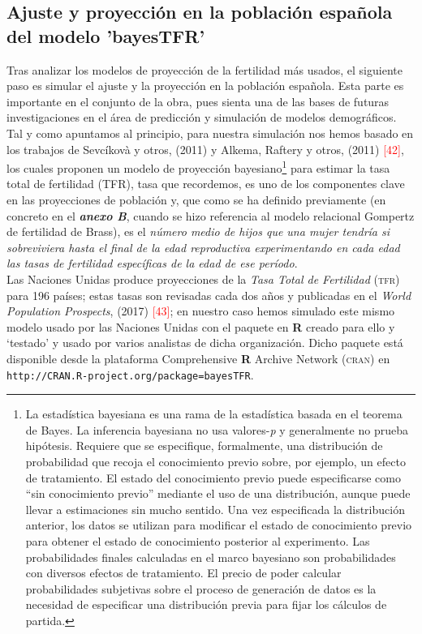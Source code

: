 \subsection{Ajuste y proyección en la poblaci\'on espa\~nola del modelo 'bayesTFR'}

Tras analizar los modelos de proyección de la fertilidad más usados, el siguiente paso es simular el ajuste y la proyección en la población española. Esta parte es importante en el conjunto de la obra, pues sienta una de las bases de futuras investigaciones en el área de predicción y simulación de modelos demográficos.\\
Tal y como apuntamos al principio, para nuestra simulación nos hemos basado en los trabajos de Sevcíkovà y otros, (2011) y Alkema, Raftery y otros, (2011) \textcolor{red}{[42]}, los cuales proponen un modelo de proyección bayesiano\footnote{La estadística bayesiana es una rama de la estadística basada en el teorema de Bayes. La inferencia bayesiana no usa valores-\textit{p} y generalmente no prueba hipótesis. Requiere que se especifique, formalmente, una distribución de probabilidad que recoja el conocimiento previo sobre, por ejemplo, un efecto de tratamiento. El estado del conocimiento previo puede especificarse como ``sin conocimiento previo'' mediante el uso de una distribución, aunque puede llevar a estimaciones sin mucho sentido. Una vez especificada la distribución anterior, los datos se utilizan para modificar el estado de conocimiento previo para obtener el estado de conocimiento posterior al experimento. Las probabilidades finales calculadas en el marco bayesiano son probabilidades con diversos efectos de tratamiento. El precio de poder calcular probabilidades subjetivas sobre el proceso de generación de datos es la necesidad de especificar una distribución previa para fijar los cálculos de partida.} para estimar la tasa total de fertilidad (TFR), tasa que recordemos, es uno de los componentes clave en las proyecciones de población y, que como se ha definido previamente (en concreto en el \textit{\textbf{anexo B}}, cuando se hizo referencia al modelo relacional Gompertz de fertilidad de Brass), es el \textit{número medio de hijos que una mujer tendría si sobreviviera hasta el final de la edad reproductiva experimentando en cada edad las tasas de fertilidad específicas de la edad de ese período}.\\
Las Naciones Unidas produce proyecciones de la \textit{Tasa Total de Fertilidad} \textsc{(tfr)} para 196 países; estas tasas son revisadas cada dos años y publicadas en el \textit{World Population Prospects}, (2017) \textcolor{red}{[43]}; en nuestro caso hemos simulado este mismo modelo usado por las Naciones Unidas con el paquete en \textsf{\textbf{R}} creado para ello y `testado' y usado por varios analistas de dicha organización. Dicho paquete está disponible desde la plataforma Comprehensive \textsf{\textbf{R}} Archive Network (\textsc{cran}) en \texttt{\small{http://CRAN.R-project.org/package=bayesTFR}}.

